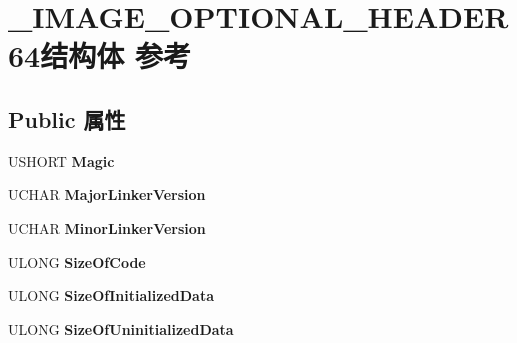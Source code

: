 \hypertarget{struct___i_m_a_g_e___o_p_t_i_o_n_a_l___h_e_a_d_e_r64}{}\section{\+\_\+\+I\+M\+A\+G\+E\+\_\+\+O\+P\+T\+I\+O\+N\+A\+L\+\_\+\+H\+E\+A\+D\+E\+R64结构体 参考}
\label{struct___i_m_a_g_e___o_p_t_i_o_n_a_l___h_e_a_d_e_r64}
\subsection*{Public 属性}
\begin{DoxyCompactItemize}
\item 
\mbox{\label{struct___i_m_a_g_e___o_p_t_i_o_n_a_l___h_e_a_d_e_r64_ab5c03adcb9ef3e8354bc2408e517c08d}} 
U\+S\+H\+O\+RT {\bfseries Magic}
\item 
\mbox{\label{struct___i_m_a_g_e___o_p_t_i_o_n_a_l___h_e_a_d_e_r64_a22167136c39f49c6622cb7d8986411db}} 
U\+C\+H\+AR {\bfseries Major\+Linker\+Version}
\item 
\mbox{\label{struct___i_m_a_g_e___o_p_t_i_o_n_a_l___h_e_a_d_e_r64_af5ae155c7158d93979300344e83e797d}} 
U\+C\+H\+AR {\bfseries Minor\+Linker\+Version}
\item 
\mbox{\label{struct___i_m_a_g_e___o_p_t_i_o_n_a_l___h_e_a_d_e_r64_ad320e4d1a34ae7a0dca244bc0c58fd75}} 
U\+L\+O\+NG {\bfseries Size\+Of\+Code}
\item 
\mbox{\label{struct___i_m_a_g_e___o_p_t_i_o_n_a_l___h_e_a_d_e_r64_ad96708232674a7e51792eee2db428c16}} 
U\+L\+O\+NG {\bfseries Size\+Of\+Initialized\+Data}
\item 
\mbox{\label{struct___i_m_a_g_e___o_p_t_i_o_n_a_l___h_e_a_d_e_r64_ac8ae0cd9fdcf7ee2df7d5162365e4711}} 
U\+L\+O\+NG {\bfseries Size\+Of\+Uninitialized\+Data}
\item 

\end{DoxyCompactItemize}
